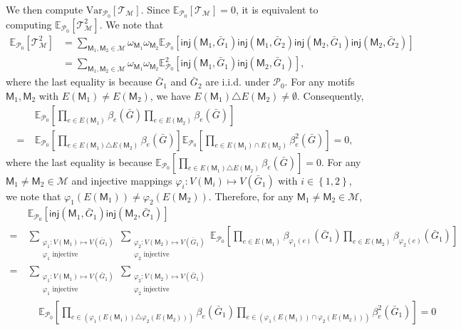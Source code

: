 \documentclass[letterpaper,11pt]{article}
\theoremstyle{definition}
\newcommand{\maM}{\mathcal{M}}
\newcommand{\maP}{\mathcal{P}}
\newcommand{\maT}{\mathcal{T}}
\newcommand{\pth}[1]{\left( #1 \right)}
\newcommand{\qth}[1]{\left[ #1 \right]}
\newcommand{\sth}[1]{\left\{ #1 \right\}}
\newcommand{\sfM}{{\mathsf{M}}}
\newcommand{\inj}{\mathsf{inj}}
\newcommand{\vp}{\varphi}
\def\var{\mathrm{Var}}
\def\E{\mathbb{E}}
\begin{document}
We then compute $\var_{{\maP_0}}\qth{\maT_{\maM}}$.
Since $\E_{\maP_0}\qth{\maT_{\maM}}=0$, it is equivalent to computing $\E_{\maP_0}\qth{\maT_{\maM}^2}$. We note that \begin{align}
    \nonumber \E_{\maP_0}\qth{\maT_{\maM}^2} &= \sum_{\sfM_1,\sfM_2\in \maM} \omega_{\sfM_1}\omega_{\sfM_2} \E_{\maP_0}\qth{\inj(\sfM_1,\bar{G}_1) \inj(\sfM_1,\bar{G}_2) \inj(\sfM_2,\bar{G}_1)\inj(\sfM_2,\bar{G}_2)}\\\label{eq:varQ-HH'}
    &=\sum_{\sfM_1,\sfM_2\in \maM} \omega_{\sfM_1}\omega_{\sfM_2} \E^2_{\maP_0}\qth{\inj(\sfM_1,\bar{G}_1)\inj(\sfM_2,\bar{G}_1)} ,
\end{align}
where the last equality is because $\bar{G}_1$ and $\bar{G}_2$ are i.i.d. under ${\maP_0}$.
For any motifs $\sfM_1,\sfM_2$ with  $E(\sfM_1)\neq E(\sfM_2)$, we have $E(\sfM_1)\triangle E(\sfM_2)\neq \emptyset$. Consequently,
\begin{align*}
    &~\E_{\maP_0}\qth{\prod_{e\in E(\sfM_1)} \beta_e(\bar{G})\prod_{e\in E(\sfM_2)} \beta_e(\bar{G})}\\ =&~ \E_{\maP_0}\qth{\prod_{e\in E(\sfM_1)\triangle E(\sfM_2)} \beta_e(\bar{G})} \E_{\maP_0}\qth{\prod_{e\in E(\sfM_1)\cap E(\sfM_2)} \beta_e^2(\bar{G})} = 0,
\end{align*}
where the last equality is because $\E_{\maP_0}\qth{\prod_{e\in E(\sfM_1)\triangle E(\sfM_2)} \beta_e(\bar{G})} = 0$.
For any $\sfM_1\neq \sfM_2\in \maM$ and injective mappings $\vp_i:V(\sfM_i)\mapsto V(\bar{G}_1)$ with $i\in \sth{1,2}$, we note that $\vp_1(E(\sfM_1))\neq \vp_2(E(\sfM_2))$.
Therefore, for any $\sfM_1\neq \sfM_2\in \maM$, 
\begin{align*}
    &~\E_{\maP_0}\qth{\inj(\sfM_1,\bar{G}_1)\inj(\sfM_2,\bar{G}_1)} \\=&~ \sum_{\substack{\varphi_1:V(\sfM_1)\mapsto V(\bar{G}_1)\\\varphi_1\text{ injective}}}\sum_{\substack{\varphi_2:V(\sfM_2)\mapsto V(\bar{G}_1)\\\varphi_2\text{ injective}}} \E_{\maP_0}\qth{\prod_{e\in E(\sfM_1)} \beta_{\vp_1(e)}(\bar{G}_1)\prod_{e\in E(\sfM_2)}\beta_{\vp_2(e)}(\bar{G}_1)}\\=&~ \sum_{\substack{\varphi_1:V(\sfM_1)\mapsto V(\bar{G}_1)\\\varphi_1\text{ injective}}}\sum_{\substack{\varphi_2:V(\sfM_2)\mapsto V(\bar{G}_1)\\\varphi_2\text{ injective}}}\\&~~~~~~ \E_{\maP_0}\qth{\prod_{e\in \pth{\vp_1(E(\sfM_1))\triangle \vp_2(E(\sfM_2))}}\beta_e(\bar{G}_1)\prod_{e\in \pth{\vp_1(E(\sfM_1))\cap \vp_2(E(\sfM_2))}}\beta_e^2(\bar{G}_1)} =0
\end{align*}
\end{document}
